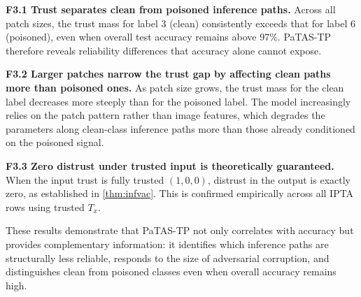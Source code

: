 \begin{tcolorbox}[title=Key findings -- Experiment 3, colback=gray!5,
colframe=gray!40, fonttitle=\bfseries, left=4pt, right=4pt,
top=4pt, bottom=4pt]

\textbf{F3.1 Trust separates clean from poisoned inference paths.} Across all patch sizes, the trust mass for label 3 (clean) consistently exceeds that for label 6 (poisoned), even when overall test accuracy remains above 97\%. \ac{PaTAS-TP} therefore reveals reliability differences that accuracy alone cannot expose.

\medskip
\textbf{F3.2 Larger patches narrow the trust gap by affecting clean paths
more than poisoned ones.} As patch size grows, the trust mass for the clean label decreases more steeply than for the poisoned label. The model increasingly relies on the patch pattern rather than image features, which degrades the parameters along clean-class inference paths more than those already conditioned on
the poisoned signal.

\medskip
\textbf{F3.3 Zero distrust under trusted input is theoretically guaranteed.} When the input trust is fully trusted $(1,0,0)$, distrust in the output is exactly zero, as established in \cref{thm:infvac}. This is confirmed empirically across all IPTA rows using trusted $T_x$.
\end{tcolorbox}

These results demonstrate that \ac{PaTAS-TP} not only correlates with accuracy but provides complementary information: it identifies which inference paths are structurally less reliable, responds to the size of adversarial corruption, and distinguishes clean from poisoned classes even when overall accuracy remains high.

\DIFaddbegin \subsubsection*{}

\paragraph*{}
\emph{}

